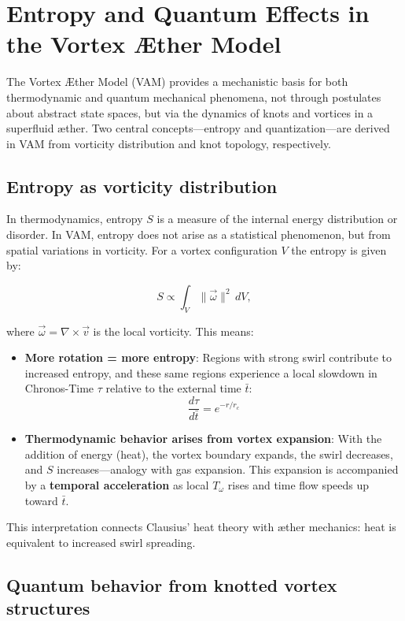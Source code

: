 \section{Entropy and Quantum Effects in the Vortex Æther Model}

The Vortex Æther Model (VAM) provides a mechanistic basis for both thermodynamic and quantum mechanical phenomena, not through postulates about abstract state spaces, but via the dynamics of knots and vortices in a superfluid æther. Two central concepts—entropy and quantization—are derived in VAM from vorticity distribution and knot topology, respectively.

\subsection{Entropy as vorticity distribution}

In thermodynamics, entropy $S$ is a measure of the internal energy distribution or disorder. In VAM, entropy does not arise as a statistical phenomenon, but from spatial variations in vorticity. For a vortex configuration $V$ the entropy is given by:

\begin{equation}
    S \propto \int_V \|\vec{\omega}\|^2 \, dV,
\end{equation}

where $\vec{\omega} = \nabla \times \vec{v}$ is the local vorticity. This means:

\begin{itemize}
    \item \textbf{More rotation = more entropy}:
    Regions with strong swirl contribute to increased entropy,
    and these same regions experience a local slowdown in Chronos-Time $\tau$ relative to the external time $\bar{t}$:
    \[
        \frac{d\tau}{d\bar{t}} = e^{-r/r_c}
    \]

    \item \textbf{Thermodynamic behavior arises from vortex expansion}:
    With the addition of energy (heat), the vortex boundary expands, the swirl decreases, and $S$ increases—analogy with gas expansion.
    This expansion is accompanied by a \textbf{temporal acceleration} as local $T_\omega$ rises and time flow speeds up toward $\bar{t}$.
\end{itemize}


This interpretation connects Clausius' heat theory with æther mechanics: heat is equivalent to increased swirl spreading.

\subsection{Quantum behavior from knotted vortex structures}

